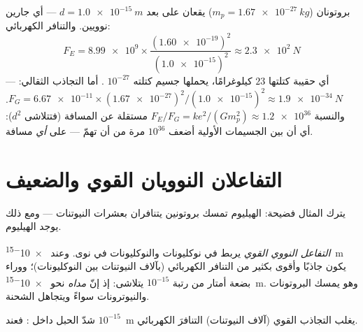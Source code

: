 \begin{example}\label{ex:g11:fundamental-interactions:protons}
بروتونان ($m_p = \qty{1.67e-27}{kg}$) يقعان على بعد $d = \qty{1.0e-15}{m}$
--- أي جارين نوويين. والتنافر الكهربائي:
\[
F_E = \num{8.99e9} \times
\frac{(\num{1.60e-19})^{2}}{(\num{1.0e-15})^{2}}
\approx \qty{2.3e2}{N}
\]
--- أي  حقيبة كتلتها $23$ كيلوغرامًا، يحملها جسيم كتلته
$10^{-27}$ . أما التجاذب الثقالي:
$F_G = \num{6.67e-11} \times (\num{1.67e-27})^{2} /
(\num{1.0e-15})^{2} \approx \qty{1.9e-34}{N}$. والنسبة
$F_E / F_G = k e^{2} / (G m_p^{2}) \approx \num{1.2e36}$
مستقلة عن المسافة (فتتلاشى $d^{2}$): أي أن  بين الجسيمات
الأولية أضعف $10^{36}$ مرة من أن تهمّ --- على \emph{أي} مسافة.
\end{example}

\section{التفاعلان النوويان القوي والضعيف}

يترك المثال فضيحة:  الهيليوم تمسك بروتونين
يتنافران بعشرات النيوتنات --- ومع ذلك يوجد الهيليوم.

\begin{definition}\label{def:g11:fundamental-interactions:strong}
\emph{التفاعل النووي القوي} يربط 
في نوكليونات والنوكليونات في نوى. وعند \qty{e-15}{m} يكون
جاذبًا وأقوى بكثير من التنافر الكهربائي (بآلاف
النيوتنات بين النوكليونات)؛ ووراء بضعة أمتار من رتبة $10^{-15}$ يتلاشى:
إذ إنّ \emph{مداه} نحو
\qty{e-15}{m}. وهو يمسك البروتونات والنيوترونات سواءً ويتجاهل الشحنة.
\end{definition}

\begin{omfigure}

{\small شدّ الحبل داخل : فعند $10^{-15}$~m يغلب التجاذب
القوي (آلاف النيوتنات) التنافرَ الكهربائي.}
\end{omfigure}

